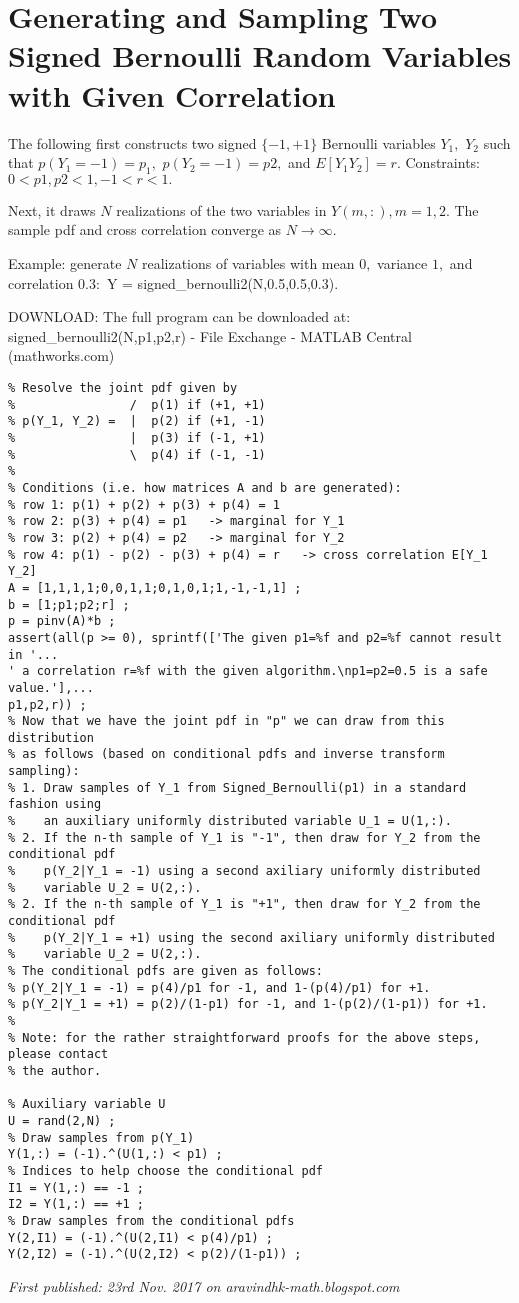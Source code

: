 \section{Generating and Sampling Two Signed Bernoulli Random Variables with Given Correlation}

The following first constructs two signed $\{-1, +1\}$ Bernoulli variables $Y_1,$ $Y_2$ such that $p(Y_1 = -1) = p_1,$ $p(Y_2 = -1) = p2,$ and $E[Y_1Y_2] = r.$ Constraints: $0 < p1,p2 < 1, -1 < r < 1.$ 

Next, it draws $N$ realizations of the two variables in $Y(m,:), m = 1,2.$ The sample pdf and cross correlation converge as $N \to \infty.$

Example: generate $N$ realizations of variables with mean $0,$ variance $1,$ and correlation $0.3:$ Y = signed\_bernoulli2(N,0.5,0.5,0.3).

DOWNLOAD: The full program can be downloaded at: signed\_bernoulli2(N,p1,p2,r) - File Exchange - MATLAB Central (mathworks.com)

\begin{verbatim}
% Resolve the joint pdf given by
%                /  p(1) if (+1, +1)
% p(Y_1, Y_2) =  |  p(2) if (+1, -1)
%                |  p(3) if (-1, +1)
%                \  p(4) if (-1, -1)
%
% Conditions (i.e. how matrices A and b are generated):
% row 1: p(1) + p(2) + p(3) + p(4) = 1
% row 2: p(3) + p(4) = p1   -> marginal for Y_1
% row 3: p(2) + p(4) = p2   -> marginal for Y_2
% row 4: p(1) - p(2) - p(3) + p(4) = r   -> cross correlation E[Y_1 Y_2]
A = [1,1,1,1;0,0,1,1;0,1,0,1;1,-1,-1,1] ;
b = [1;p1;p2;r] ;
p = pinv(A)*b ;
assert(all(p >= 0), sprintf(['The given p1=%f and p2=%f cannot result in '...
' a correlation r=%f with the given algorithm.\np1=p2=0.5 is a safe value.'],...
p1,p2,r)) ;
% Now that we have the joint pdf in "p" we can draw from this distribution
% as follows (based on conditional pdfs and inverse transform sampling):
% 1. Draw samples of Y_1 from Signed_Bernoulli(p1) in a standard fashion using
%    an auxiliary uniformly distributed variable U_1 = U(1,:).
% 2. If the n-th sample of Y_1 is "-1", then draw for Y_2 from the conditional pdf
%    p(Y_2|Y_1 = -1) using a second axiliary uniformly distributed
%    variable U_2 = U(2,:).
% 2. If the n-th sample of Y_1 is "+1", then draw for Y_2 from the conditional pdf
%    p(Y_2|Y_1 = +1) using the second axiliary uniformly distributed
%    variable U_2 = U(2,:).
% The conditional pdfs are given as follows:
% p(Y_2|Y_1 = -1) = p(4)/p1 for -1, and 1-(p(4)/p1) for +1.
% p(Y_2|Y_1 = +1) = p(2)/(1-p1) for -1, and 1-(p(2)/(1-p1)) for +1.
%
% Note: for the rather straightforward proofs for the above steps, please contact
% the author.

% Auxiliary variable U
U = rand(2,N) ;
% Draw samples from p(Y_1)
Y(1,:) = (-1).^(U(1,:) < p1) ;
% Indices to help choose the conditional pdf
I1 = Y(1,:) == -1 ;
I2 = Y(1,:) == +1 ;
% Draw samples from the conditional pdfs
Y(2,I1) = (-1).^(U(2,I1) < p(4)/p1) ;
Y(2,I2) = (-1).^(U(2,I2) < p(2)/(1-p1)) ;
\end{verbatim}

\emph{First published: 23rd Nov. 2017 on aravindhk-math.blogspot.com}
